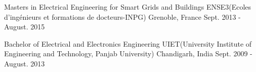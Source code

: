\begin{cventries}
  \cventry
    {Masters in Electrical Engineering for Smart Grids and Buildings}
    {ENSE3(Ecoles d'ingénieurs et formations de docteurs-INPG)}
    {Grenoble, France}
    {Sept. 2013 - August. 2015}{}
    
    \vspace{-.5\baselineskip}
 \cventry
    {Bachelor of Electrical and Electronics Engineering}
    {UIET(University Institute of Engineering and Technology, Panjab University)}
    {Chandigarh, India}
    {Sept. 2009 - August. 2013}{}
    \vspace{-.5\baselineskip}
\end{cventries}

